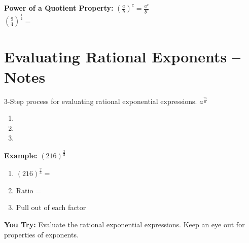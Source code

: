\documentclass[12pt]{article}
\begin{document}
\textbf{Power of a Quotient Property:} $\left(\frac{a}{b}\right)^c=\frac{a^c}{b^c}$\\

\hspace{1in} $\left(\frac{9}{4}\right)^{\frac{1}{2}}=$\\

\vspace{1cm}


\pagebreak

\section{Evaluating Rational Exponents -- Notes}

3-Step process for evaluating rational exponential expressions. $a^{\frac{m}{n}}$

\begin{enumerate}

	\item 
	
	\item 
	
	\item 

\end{enumerate}

\textbf{Example:} $\left(216\right)^{\frac{2}{3}}$\\

	\begin{enumerate}
	
		\item $\left(216\right)^{\frac{2}{3}}= $\\
		
		\item Ratio = \\
		
		\item Pull out \underline{\hspace{1cm}} of each factor  
	
	
	\end{enumerate}

\hrulefill

\textbf{You Try:} Evaluate the rational exponential expressions. Keep an eye out for properties of exponents.\\
\end{document}
